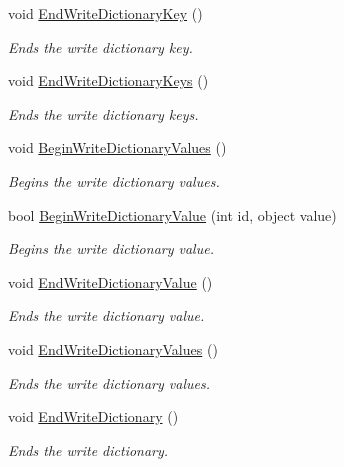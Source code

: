 \begin{DoxyCompactItemize}
void \hyperlink{interface_serialization_1_1_i_storage_a67dd08c902044dab8fbc00ee081e4908}{End\+Write\+Dictionary\+Key} ()
\begin{DoxyCompactList}\small\item\em Ends the write dictionary key. \end{DoxyCompactList}\item 
void \hyperlink{interface_serialization_1_1_i_storage_a3b92e2da24caf59872668c269d102e87}{End\+Write\+Dictionary\+Keys} ()
\begin{DoxyCompactList}\small\item\em Ends the write dictionary keys. \end{DoxyCompactList}\item 
void \hyperlink{interface_serialization_1_1_i_storage_af44f1eb41f0ac51acf315388150bd6bf}{Begin\+Write\+Dictionary\+Values} ()
\begin{DoxyCompactList}\small\item\em Begins the write dictionary values. \end{DoxyCompactList}\item 
bool \hyperlink{interface_serialization_1_1_i_storage_a553edaa5a225986c161626c9ede9e594}{Begin\+Write\+Dictionary\+Value} (int id, object value)
\begin{DoxyCompactList}\small\item\em Begins the write dictionary value. \end{DoxyCompactList}\item 
void \hyperlink{interface_serialization_1_1_i_storage_ab14d2fe3fc5d3ed7171435152b060bf2}{End\+Write\+Dictionary\+Value} ()
\begin{DoxyCompactList}\small\item\em Ends the write dictionary value. \end{DoxyCompactList}\item 
void \hyperlink{interface_serialization_1_1_i_storage_ad1d8b55f3ae8fa16cf2dc58103263999}{End\+Write\+Dictionary\+Values} ()
\begin{DoxyCompactList}\small\item\em Ends the write dictionary values. \end{DoxyCompactList}\item 
void \hyperlink{interface_serialization_1_1_i_storage_ad04875ff178a85ce0054eab86a277fd3}{End\+Write\+Dictionary} ()
\begin{DoxyCompactList}\small\item\em Ends the write dictionary. \end{DoxyCompactList}\item 

\end{DoxyCompactItemize}

